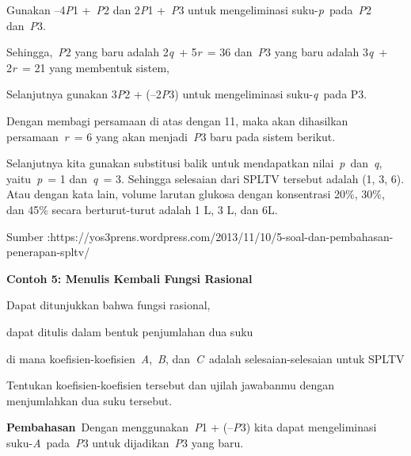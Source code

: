 \documentclass[11pt,fleqn]{book} %
\begin{document}
\noindent Gunakan --4\textit{P}1 +~\textit{P}2 dan 2\textit{P}1 +~\textit{P}3 untuk mengeliminasi suku-\textit{p}~pada~\textit{P}2 dan~\textit{P}3.

\noindent

\noindent 

\noindent Sehingga,~\textit{P}2 yang baru adalah 2\textit{q}~+ 5\textit{r}~= 36 dan~\textit{P}3 yang baru adalah 3\textit{q}~+ 2\textit{r}~= 21 yang membentuk sistem,

\noindent 

\noindent Selanjutnya gunakan 3\textit{P}2 + (--2\textit{P}3) untuk mengeliminasi suku-\textit{q}~pada P3.

\noindent 

\noindent 

\noindent Dengan membagi persamaan di atas dengan 11, maka akan dihasilkan persamaan~\textit{r}~= 6 yang akan menjadi~\textit{P}3 baru pada sistem berikut.

\noindent 

\noindent Selanjutnya kita gunakan substitusi balik untuk mendapatkan nilai~\textit{p}~dan~\textit{q}, yaitu~\textit{p}~= 1 dan~\textit{q}~= 3. Sehingga selesaian dari SPLTV tersebut adalah (1, 3, 6). Atau dengan kata lain, volume larutan glukosa dengan konsentrasi 20\%, 30\%, dan 45\% secara berturut-turut adalah 1 L, 3 L, dan 6L.

\noindent Sumber :https://yos3prens.wordpress.com/2013/11/10/5-soal-dan-pembahasan-penerapan-spltv/

\noindent 

\noindent \textbf{Contoh 5: Menulis Kembali Fungsi Rasional}

\noindent Dapat ditunjukkan bahwa fungsi rasional,

\noindent 

\noindent dapat ditulis dalam bentuk penjumlahan dua suku

\noindent 

\noindent di mana koefisien-koefisien~\textit{A},~\textit{B}, dan~\textit{C}~adalah selesaian-selesaian untuk SPLTV

\noindent 

\noindent Tentukan koefisien-koefisien tersebut dan ujilah jawabanmu dengan menjumlahkan dua suku tersebut.

\noindent 

\noindent \textbf{Pembahasan}~Dengan menggunakan~\textit{P}1 + (--\textit{P}3) kita dapat mengeliminasi suku-\textit{A}~pada~\textit{P}3 untuk dijadikan~\textit{P}3 yang baru.
\end{document}
